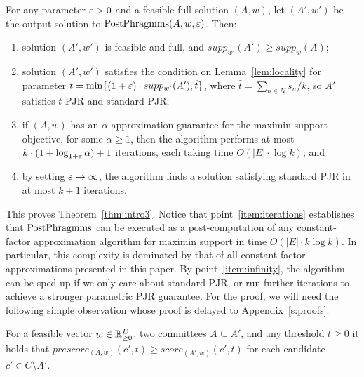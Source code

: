 \begin{theorem}\label{thm:enabler}
For any parameter $\varepsilon>0$ and a feasible full solution $(A,w)$, let $(A',w')$ be the output solution to $\operatorname{PostPhragmms}(A,w,\varepsilon)$. Then: 
\begin{enumerate}
    \item solution $(A',w')$ is feasible and full, and $supp_{w'}(A')\geq supp_w(A)$; \label{item:support}
    \item solution $(A', w')$ satisfies the condition on Lemma~\ref{lem:locality} for parameter $t=\min\{(1+\varepsilon)\cdot supp_{w'}(A'), \hat{t}\}$, where $\hat{t}=\sum_{n\in N} s_n / k$, so $A'$ satisfies $t$-PJR and standard PJR; 
		\label{item:tPJR}
		\item if $(A,w)$ has an $\alpha$-approximation guarantee for the maximin support objective, for some $\alpha\geq 1$, then the algorithm performs at most $k\cdot (1+\log_{1+\varepsilon} \alpha)+1$ iterations, each taking time $O(|E|\cdot \log k)$; and \label{item:iterations}
		\item by setting $\varepsilon\rightarrow\infty$, the algorithm finds a solution satisfying standard PJR in at most $k+1$ iterations. \label{item:infinity}

\end{enumerate}
\end{theorem}

This proves Theorem~\ref{thm:intro3}. 
Notice that point~\ref{item:iterations} establishes that $\operatorname{PostPhragmms}$ can be executed as a post-computation of any constant-factor approximation algorithm for maximin support in time $O(|E|\cdot k\log k)$. In particular, this complexity is dominated by that of all constant-factor approximations presented in this paper.
By point~\ref{item:infinity}, the algorithm can be sped up if we only care about standard PJR, or run further iterations to achieve a stronger parametric PJR guarantee. 
For the proof, we will need the following simple observation whose proof is delayed to Appendix~\ref{s:proofs}.

\begin{lemma}\label{lem:sameweight}
For a feasible vector $w\in \mathbb{R}_{\geq 0}^E$, two committees $A\subseteq A'$, and any threshold $t\geq 0$ it holds that $prescore_{(A,w)}(c',t)\geq score_{(A',w)}(c',t)$ for each candidate $c'\in C\setminus A'$.
\end{lemma}

